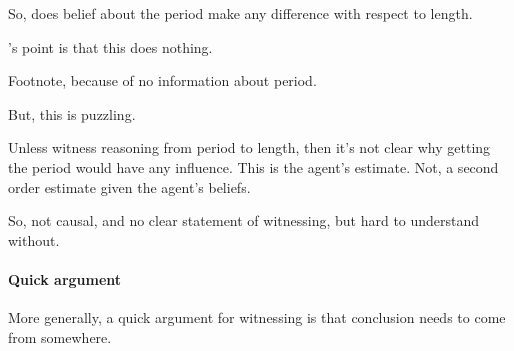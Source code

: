 \begin{note}
  So, does belief about the period make any difference with respect to length.

  \citeauthor{Tolliver:1982us}'s point is that this does nothing.

  Footnote, because of no information about period.

  But, this is puzzling.

  Unless witness reasoning from period to length, then it's not clear why getting the period would have any influence.
  This is the agent's estimate.
  Not, a second order estimate given the agent's beliefs.

  So, not causal, and no clear statement of witnessing, but hard to understand without.
\end{note}

\paragraph*{Quick argument}

\begin{note}
  More generally, a quick argument for witnessing is that conclusion needs to come from somewhere.
\end{note}

